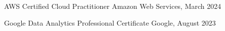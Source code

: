 %
%


\cvcertification
  {AWS Certified Cloud Practitioner}
  {Amazon Web Services, March 2024}
  {}

\cvcertification
  {Google Data Analytics Professional Certificate}
  {Google, August 2023}
  {}
